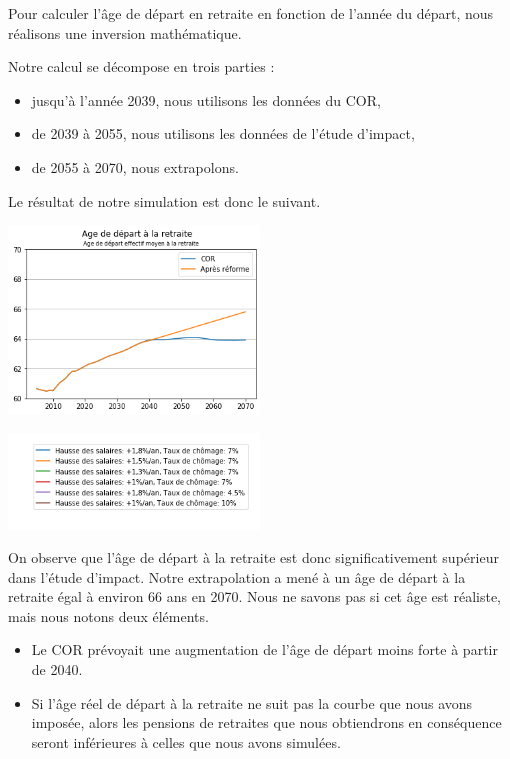 \documentclass[10pt]{article}
\begin{document}
Pour calculer l'âge de départ en retraite en fonction de l'année du départ, 
nous réalisons une inversion mathématique.  

Notre calcul se décompose en trois parties :
\begin{itemize}
\item jusqu'à l'année 2039, nous utilisons les données du COR, 
\item de 2039 à 2055, nous utilisons les données de l'étude d'impact,
\item de 2055 à 2070, nous extrapolons. 
\end{itemize}

Le résultat de notre simulation est donc le suivant. 

\begin{center}
\includegraphics[width=0.5\textwidth]{Simulation-Age.png}

\includegraphics[width=0.5\textwidth]{Simulation-legende.png}
\end{center}

On observe que l'âge de départ à la retraite est donc 
significativement supérieur dans l'étude d'impact. 
Notre extrapolation a mené à un âge de départ à la retraite égal à 
environ 66 ans en 2070. 
Nous ne savons pas si cet âge est réaliste, mais nous notons deux éléments. 
\begin{itemize}
\item Le COR prévoyait une augmentation de l'âge de départ moins 
forte à partir de 2040. 
\item Si l'âge réel de départ à la retraite ne suit pas la courbe 
que nous avons imposée, alors les pensions de retraites que nous 
obtiendrons en conséquence seront inférieures à celles que nous avons 
simulées. 
\end{itemize}
\end{document}
